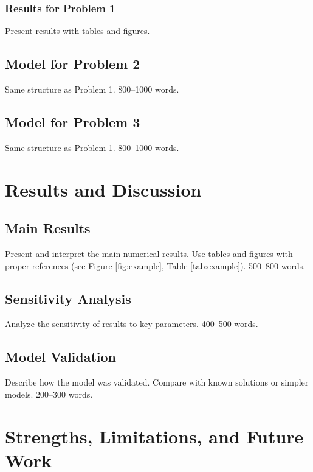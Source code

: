 \documentclass[12pt,letterpaper]{article}
\numberwithin{equation}{section}
\numberwithin{figure}{section}
\numberwithin{table}{section}
\begin{document}
\subsubsection{Results for Problem 1}
\textlangle Present results with tables and figures.\textrangle

\subsection{Model for Problem 2}
\textlangle Same structure as Problem 1. 800--1000 words.\textrangle

\subsection{Model for Problem 3}
\textlangle Same structure as Problem 1. 800--1000 words.\textrangle

\section{Results and Discussion}

\subsection{Main Results}
\textlangle Present and interpret the main numerical results. Use tables and figures with proper references (see Figure \ref{fig:example}, Table \ref{tab:example}). 500--800 words.\textrangle

\subsection{Sensitivity Analysis}
\textlangle Analyze the sensitivity of results to key parameters. 400--500 words.\textrangle

\subsection{Model Validation}
\textlangle Describe how the model was validated. Compare with known solutions or simpler models. 200--300 words.\textrangle

\section{Strengths, Limitations, and Future Work}
\end{document}
